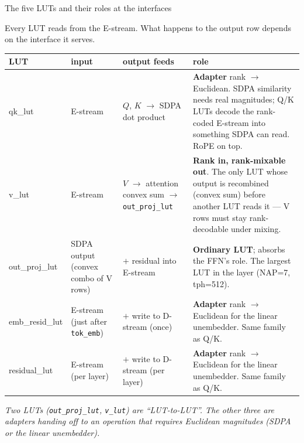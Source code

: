\documentclass[aspectratio=169]{beamer}
\begin{document}
\begin{frame}{The five LUTs and their roles at the interfaces}

Every LUT reads from the E-stream. What happens to the output row depends on the interface it serves.

\medskip
\centering
\scriptsize
\renewcommand{\arraystretch}{1.15}
\begin{tabular}{@{}>{\ttfamily}l p{2.3cm} p{3.0cm} p{5.6cm}@{}}
\toprule
\textnormal{\textbf{LUT}} & \textbf{input} & \textbf{output feeds} & \textbf{role} \\
\midrule
qk\_lut        & E-stream & \(Q\), \(K\) \(\to\) SDPA dot product & \textbf{Adapter} rank \(\to\) Euclidean. SDPA similarity needs real magnitudes; Q/K LUTs decode the rank-coded E-stream into something SDPA can read. RoPE on top. \\
v\_lut         & E-stream & \(V\) \(\to\) attention convex sum \(\to\) \texttt{out\_proj\_lut} & \textbf{Rank in, rank-mixable out}. The only LUT whose output is recombined (convex sum) before another LUT reads it --- V rows must stay rank-decodable under mixing. \\
out\_proj\_lut & SDPA output (convex combo of V rows) & \(+\) residual into E-stream & \textbf{Ordinary LUT}; absorbs the FFN's role. The largest LUT in the layer (NAP=7, tph=512). \\
emb\_resid\_lut & E-stream (just after \texttt{tok\_emb}) & \(+\) write to D-stream (once) & \textbf{Adapter} rank \(\to\) Euclidean for the linear unembedder. Same family as Q/K. \\
residual\_lut  & E-stream (per layer) & \(+\) write to D-stream (per layer) & \textbf{Adapter} rank \(\to\) Euclidean for the linear unembedder. Same family as Q/K. \\
\bottomrule
\end{tabular}

\vspace{0.5em}
\small\emph{Two LUTs (\texttt{out\_proj\_lut}, \texttt{v\_lut}) are ``LUT-to-LUT''. The other three are adapters handing off to an operation that requires Euclidean magnitudes (SDPA or the linear unembedder).}
\end{frame}
\end{document}
